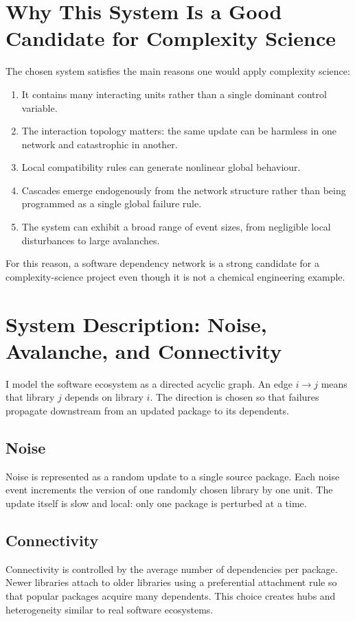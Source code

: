 \documentclass[11pt]{article}
\begin{document}
\section{Why This System Is a Good Candidate for Complexity Science}
The chosen system satisfies the main reasons one would apply complexity science:

\begin{enumerate}[leftmargin=1.4em]
\item It contains many interacting units rather than a single dominant control variable.
\item The interaction topology matters: the same update can be harmless in one network and catastrophic in another.
\item Local compatibility rules can generate nonlinear global behaviour.
\item Cascades emerge endogenously from the network structure rather than being programmed as a single global failure rule.
\item The system can exhibit a broad range of event sizes, from negligible local disturbances to large avalanches.
\end{enumerate}

For this reason, a software dependency network is a strong candidate for a complexity-science project even though it is not a chemical engineering example.

\section{System Description: Noise, Avalanche, and Connectivity}
I model the software ecosystem as a directed acyclic graph. An edge $i \to j$ means that library $j$ depends on library $i$. The direction is chosen so that failures propagate downstream from an updated package to its dependents.

\subsection{Noise}
Noise is represented as a random update to a single source package. Each noise event increments the version of one randomly chosen library by one unit. The update itself is slow and local: only one package is perturbed at a time.

\subsection{Connectivity}
Connectivity is controlled by the average number of dependencies per package. Newer libraries attach to older libraries using a preferential attachment rule so that popular packages acquire many dependents. This choice creates hubs and heterogeneity similar to real software ecosystems.
\end{document}
